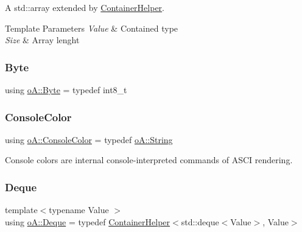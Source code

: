 A std\+::array extended by \mbox{\hyperlink{classo_a_1_1_container_helper}{Container\+Helper}}. 


\begin{DoxyTemplParams}{Template Parameters}
{\em Value} & Contained type \\
\hline
{\em Size} & Array lenght \\
\hline
\end{DoxyTemplParams}
\mbox{\label{namespaceo_a_a2b99671898a8eb4bc6ab35036701d732}} 
\subsubsection{\texorpdfstring{Byte}{Byte}}
{\footnotesize\ttfamily using \mbox{\hyperlink{namespaceo_a_a2b99671898a8eb4bc6ab35036701d732}{o\+A\+::\+Byte}} = typedef int8\+\_\+t}

\mbox{\label{namespaceo_a_a747e07c1977a29f3e1d38683043ec927}} 
\subsubsection{\texorpdfstring{Console\+Color}{ConsoleColor}}
{\footnotesize\ttfamily using \mbox{\hyperlink{namespaceo_a_a747e07c1977a29f3e1d38683043ec927}{o\+A\+::\+Console\+Color}} = typedef \mbox{\hyperlink{classo_a_1_1_string}{o\+A\+::\+String}}}



Console colors are internal console-\/interpreted commands of A\+S\+CI rendering. 

\mbox{\label{namespaceo_a_a3ac69d4df0d84ed5c8aa6dd69547497d}} 
\subsubsection{\texorpdfstring{Deque}{Deque}}
{\footnotesize\ttfamily template$<$typename Value $>$ \\
using \mbox{\hyperlink{namespaceo_a_a3ac69d4df0d84ed5c8aa6dd69547497d}{o\+A\+::\+Deque}} = typedef \mbox{\hyperlink{classo_a_1_1_container_helper}{Container\+Helper}}$<$std\+::deque$<$Value$>$, Value$>$}



